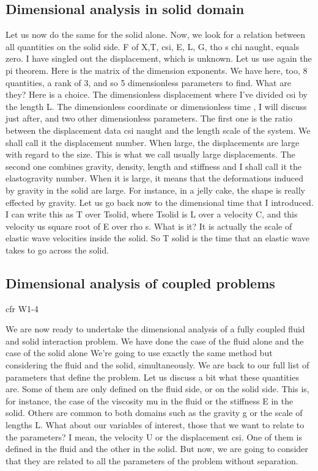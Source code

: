 \subsection{Dimensional analysis in solid domain}

Let us now do the same for
the solid alone. Now, we look for a relation between
all quantities on the solid side. F of X,T, csi, E, L, G, tho s chi naught, equals zero. I have singled out the displacement, which is unknown. 
Let us use again the pi theorem. Here is the matrix of
the dimension exponents. We have here, too,  8 quantities, a rank of 3, and so 5 dimensionless parameters to find. What are they? Here is a choice. The dimensionless  displacement where
I've divided csi by the length L. The dimensionless coordinate or
dimensionless time , I will discuss just after, and
two other dimensionless parameters. The first one is the ratio between
the displacement data csi naught  and the length scale of the system. We shall call it the displacement number. When large, the displacements
are large with regard to the size. This is what we call
usually large displacements. The second one combines gravity,
density, length and stiffness and I shall call it
the elastogravity number. When it is large, it means that the deformations induced 
by gravity in the solid are large. For instance, in a jelly cake,
the shape is really effected by gravity. Let us go back now to the dimensional
time that I introduced. I can write this as T over Tsolid,
where Tsolid is L over a velocity C, and this velocity us
square root of E over rho s. What is it? It is actually the scale of elastic
wave velocities inside the solid. So T solid is the time that an elastic
wave takes to go across the solid.


\subsection{Dimensional analysis of coupled problems}

cfr W1-4

We are now ready to undertake
the dimensional analysis of a fully coupled fluid and solid interaction problem. We have done the case of the fluid alone and
the case of the solid alone We're going to use exactly the same
method but considering the fluid and the solid, simultaneously. We are back to our full list of
parameters that define the problem. Let us discuss a bit what
these quantities are. Some of them are only defined on
the fluid side, or on the solid side. This is, for instance, the case of
the viscosity mu in the fluid or the stiffness E in the solid. Others are common to both domains such as
the gravity g or the scale of lengths L. What about our variables of interest, those that we want to
relate to the parameters? I mean, the velocity U or
the displacement csi. One of them is defined in the fluid and
the other in the solid. But now, we are going to consider
that they are related  to all the parameters of the problem without separation.

